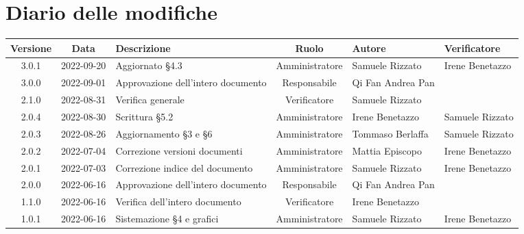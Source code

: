 \section*{Diario delle modifiche}
	\begin{center}
	\renewcommand{\arraystretch}{1.8} %
	\begin{longtable}{ |c|c|p{8em}|c|m{5em}|m{6em}| }
		\hline
		\textbf{Versione} & \textbf{Data} & \textbf{Descrizione} &  \textbf{Ruolo} &  \textbf{Autore} & \textbf{Verificatore} \\
    	\hline
		3.0.1 & 2022-09-20 & Aggiornato §4.3 & Amministratore & Samuele \newline Rizzato & Irene \newline Benetazzo \\
    	\hline
		3.0.0 & 2022-09-01 & Approvazione dell'intero documento & Responsabile & Qi Fan \newline Andrea Pan & \\
		\hline
		2.1.0 & 2022-08-31 & Verifica generale & Verificatore & Samuele \newline Rizzato & \\
		\hline
		2.0.4 & 2022-08-30 & Scrittura §5.2 & Amministratore & Irene \newline Benetazzo & Samuele \newline Rizzato\\
		\hline
		2.0.3 & 2022-08-26 & Aggiornamento §3 e §6 & Amministratore & Tommaso Berlaffa & Samuele \newline Rizzato\\
		\hline
		2.0.2 & 2022-07-04 & Correzione versioni documenti & Amministratore & Mattia \newline Episcopo & Irene \newline Benetazzo\\
		\hline
		2.0.1 & 2022-07-03 & Correzione indice del documento & Amministratore & Samuele \newline Rizzato & Irene \newline Benetazzo\\
		\hline
		2.0.0 & 2022-06-16 & Approvazione dell'intero documento & Responsabile & Qi Fan \newline Andrea Pan & \\
		\hline
		1.1.0 & 2022-06-16 & Verifica dell'intero documento & Verificatore & Irene \newline Benetazzo & \\
		\hline
		1.0.1 & 2022-06-16 & Sistemazione §4 e grafici & Amministratore & Samuele \newline Rizzato & Irene \newline Benetazzo \\

\end{longtable}
\end{center}
